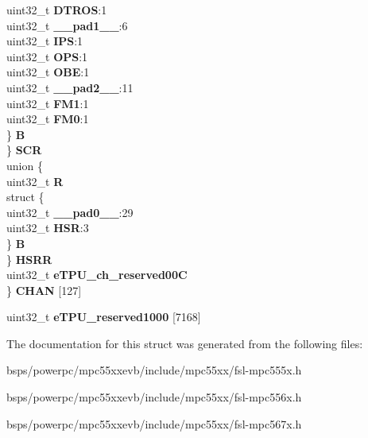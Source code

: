 \begin{DoxyCompactItemize}
\begin{tabbing}
\>\>\>uint32\_t {\bfseries DTROS}:1\\
\>\>\>uint32\_t {\bfseries \_\_pad1\_\_}:6\\
\>\>\>uint32\_t {\bfseries IPS}:1\\
\>\>\>uint32\_t {\bfseries OPS}:1\\
\>\>\>uint32\_t {\bfseries OBE}:1\\
\>\>\>uint32\_t {\bfseries \_\_pad2\_\_}:11\\
\>\>\>uint32\_t {\bfseries FM1}:1\\
\>\>\>uint32\_t {\bfseries FM0}:1\\
\>\>\} {\bfseries B}\\
\>\} {\bfseries SCR}\\
\>union \{\\
\>\>uint32\_t {\bfseries R}\\
\>\>struct \{\\
\>\>\>uint32\_t {\bfseries \_\_pad0\_\_}:29\\
\>\>\>uint32\_t {\bfseries HSR}:3\\
\>\>\} {\bfseries B}\\
\>\} {\bfseries HSRR}\\
\>uint32\_t {\bfseries eTPU\_ch\_reserved00C}\\
\} {\bfseries CHAN} \mbox{[}127\mbox{]}\\

\end{tabbing}\item 
\mbox{\label{structETPU__tag_ad53490cd095be737fa7bf376eeddfe64}} 
uint32\+\_\+t {\bfseries e\+T\+P\+U\+\_\+reserved1000} \mbox{[}7168\mbox{]}
\end{DoxyCompactItemize}


The documentation for this struct was generated from the following files\+:\begin{DoxyCompactItemize}
\item 
bsps/powerpc/mpc55xxevb/include/mpc55xx/fsl-\/mpc555x.\+h\item 
bsps/powerpc/mpc55xxevb/include/mpc55xx/fsl-\/mpc556x.\+h\item 
bsps/powerpc/mpc55xxevb/include/mpc55xx/fsl-\/mpc567x.\+h\end{DoxyCompactItemize}
